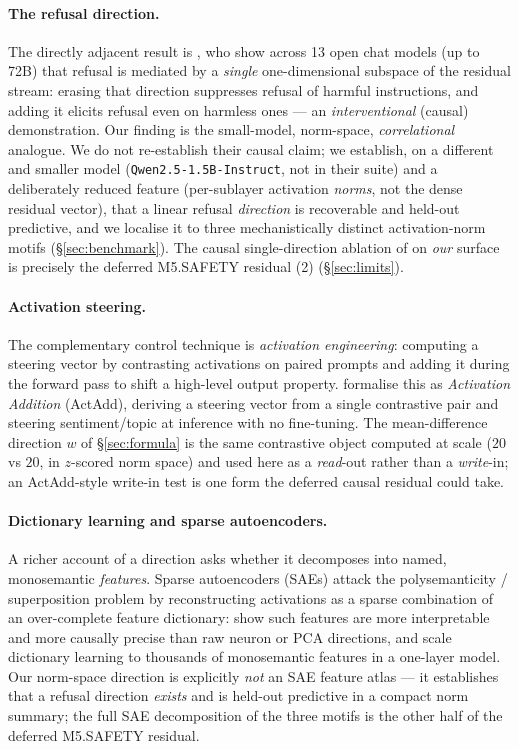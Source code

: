 \documentclass[11pt,a4paper]{article}
\begin{document}
\paragraph{The refusal direction.} The directly adjacent result is
\citet{arditi2024refusal}, who show across 13 open chat models (up to 72B) that
refusal is mediated by a \emph{single} one-dimensional subspace of the residual
stream: erasing that direction suppresses refusal of harmful instructions, and
adding it elicits refusal even on harmless ones --- an \emph{interventional}
(causal) demonstration. Our finding is the small-model, norm-space,
\emph{correlational} analogue. We do not re-establish their causal claim;
we establish, on a different and smaller model
(\texttt{Qwen2.5-1.5B-Instruct}, not in their suite) and a deliberately reduced
feature (per-sublayer activation \emph{norms}, not the dense residual vector),
that a linear refusal \emph{direction} is recoverable and held-out predictive,
and we localise it to three mechanistically distinct activation-norm motifs
(\S\ref{sec:benchmark}). The causal single-direction ablation of
\citet{arditi2024refusal} on \emph{our} surface is precisely the deferred
M5.SAFETY residual (2) (\S\ref{sec:limits}).

\paragraph{Activation steering.} The complementary control technique is
\emph{activation engineering}: computing a steering vector by contrasting
activations on paired prompts and adding it during the forward pass to shift a
high-level output property. \citet{turner2023actadd} formalise this as
\emph{Activation Addition} (ActAdd), deriving a steering vector from a single
contrastive pair and steering sentiment/topic at inference with no fine-tuning.
The mean-difference direction $w$ of \S\ref{sec:formula} is the same contrastive
object computed at scale ($20$ vs $20$, in $z$-scored norm space) and used here
as a \emph{read}-out rather than a \emph{write}-in; an ActAdd-style write-in test
is one form the deferred causal residual could take.

\paragraph{Dictionary learning and sparse autoencoders.} A richer account of a
direction asks whether it decomposes into named, monosemantic
\emph{features}. Sparse autoencoders (SAEs) attack the polysemanticity /
superposition problem by reconstructing activations as a sparse combination of
an over-complete feature dictionary: \citet{cunningham2023sae} show such
features are more interpretable and more causally precise than raw neuron or
PCA directions, and \citet{bricken2023monosemanticity} scale dictionary
learning to thousands of monosemantic features in a one-layer model. Our
norm-space direction is explicitly \emph{not} an SAE feature atlas --- it
establishes that a refusal direction \emph{exists} and is held-out predictive
in a compact norm summary; the full SAE decomposition of the three motifs is the
other half of the deferred M5.SAFETY residual.
\end{document}

